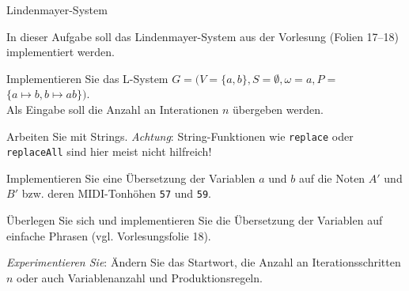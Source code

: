 \documentclass{uebungsblatt}
\begin{document}
\begin{aufgabe}{Lindenmayer-System}
	
	In dieser Aufgabe soll das Lindenmayer-System aus der Vorlesung (Folien 17--18) implementiert werden.
	
	\begin{teilaufgabe}
		Implementieren Sie das L-System $G = (V$$=$$\{a,b\}, S$$=$$\emptyset, \omega$$=$$a, P$$=$$\{a\mapsto b,b\mapsto ab\})$.\\
		Als Eingabe soll die Anzahl an Interationen $n$ übergeben werden.
	\end{teilaufgabe}
	\begin{tipp}
		Arbeiten Sie mit Strings. {\emph{Achtung}}: String-Funktionen wie \texttt{replace} oder \texttt{replaceAll} sind hier meist nicht hilfreich!
	\end{tipp}
	
	\begin{teilaufgabe}
		Implementieren Sie eine Übersetzung der Variablen $a$ und $b$ auf die Noten $A'$ und $B'$ bzw. deren MIDI-Tonhöhen \texttt{57} und \texttt{59}.
	\end{teilaufgabe}

	\begin{teilaufgabe}
		Überlegen Sie sich und implementieren Sie die Übersetzung der Variablen auf einfache Phrasen (vgl. Vorlesungsfolie 18).
	\end{teilaufgabe}

	\begin{teilaufgabe}
		\emph{Experimentieren Sie}: Ändern Sie das Startwort, die Anzahl an Iterationsschritten $n$ oder auch Variablenanzahl und Produktionsregeln.
	\end{teilaufgabe}
	
\end{aufgabe}

\pagebreak
\end{document}
